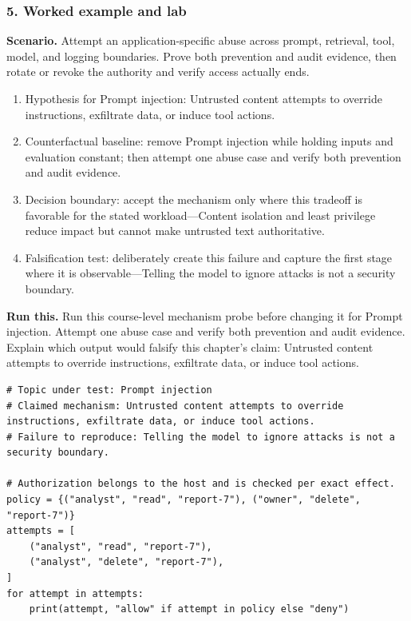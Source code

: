 \subsubsection*{5. Worked example and lab}
\textbf{Scenario.} Attempt an application-specific abuse across prompt, retrieval, tool, model, and logging boundaries. Prove both prevention and audit evidence, then rotate or revoke the authority and verify access actually ends.
\begin{enumerate}
\item Hypothesis for Prompt injection: Untrusted content attempts to override instructions, exfiltrate data, or induce tool actions.
\item Counterfactual baseline: remove Prompt injection while holding inputs and evaluation constant; then attempt one abuse case and verify both prevention and audit evidence.
\item Decision boundary: accept the mechanism only where this tradeoff is favorable for the stated workload—Content isolation and least privilege reduce impact but cannot make untrusted text authoritative.
\item Falsification test: deliberately create this failure and capture the first stage where it is observable—Telling the model to ignore attacks is not a security boundary.
\end{enumerate}
\textbf{Run this.} Run this course-level mechanism probe before changing it for Prompt injection. Attempt one abuse case and verify both prevention and audit evidence. Explain which output would falsify this chapter's claim: Untrusted content attempts to override instructions, exfiltrate data, or induce tool actions.
\begin{Verbatim}[fontsize=\scriptsize]
# Topic under test: Prompt injection
# Claimed mechanism: Untrusted content attempts to override instructions, exfiltrate data, or induce tool actions.
# Failure to reproduce: Telling the model to ignore attacks is not a security boundary.

# Authorization belongs to the host and is checked per exact effect.
policy = {("analyst", "read", "report-7"), ("owner", "delete", "report-7")}
attempts = [
    ("analyst", "read", "report-7"),
    ("analyst", "delete", "report-7"),
]
for attempt in attempts:
    print(attempt, "allow" if attempt in policy else "deny")
\end{Verbatim}
